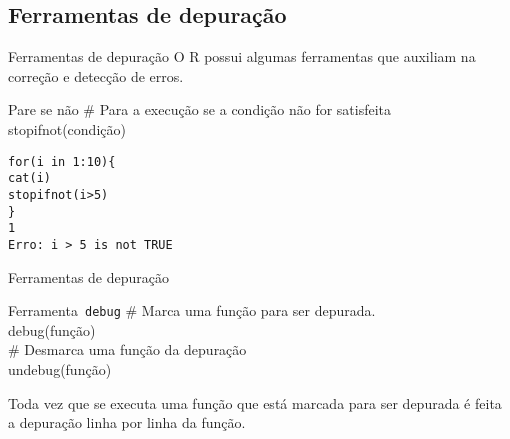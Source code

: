 \documentclass[handout]{beamer}
\begin{document}
\subsection{Ferramentas de depuração}
\begin{frame}{Ferramentas de depuração}
  O R possui algumas ferramentas que auxiliam na correção e detecção
  de erros.
  \begin{block} {Pare se não}
    \# Para a execução se a condição não for satisfeita\\
    stopifnot(condição)
  \end{block}

  \texttt{for(i in 1:10)\{\\
      \hspace{30pt}  cat(i)\\
      \hspace{30pt} stopifnot(i>5)\\
    \}\\
    1\\
    Erro: i > 5 is not TRUE }
\end{frame}
\begin{frame}{Ferramentas de depuração}

  \begin{block}{Ferramenta\texttt{ debug}}
  \# Marca uma função para ser depurada.\\
   debug(função)\\ \vspace{10pt}
   \# Desmarca uma função da depuração\\
   undebug(função)
  \end{block}
Toda vez que se executa uma função que está marcada para ser depurada é feita a depuração linha por linha da função.
  \end{frame}
\end{document}
